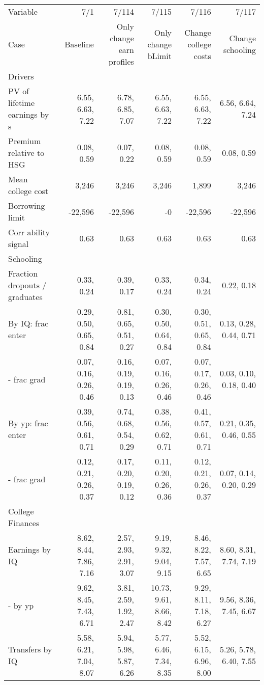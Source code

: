 \begin{tabular}{lrrrrr}
\hline
Variable & 7/1  & 7/114  & 7/115  & 7/116  & 7/117  \\
Case & Baseline  & Only change earn profiles  & Only change bLimit  & Change college costs  & Change schooling  \\
Drivers &   &   &   &   &   \\
PV of lifetime earnings by s & 6.55, 6.63, 7.22  & 6.78, 6.85, 7.07  & 6.55, 6.63, 7.22  & 6.55, 6.63, 7.22  & 6.56, 6.64, 7.24  \\
Premium relative to HSG & 0.08, 0.59  & 0.07, 0.22  & 0.08, 0.59  & 0.08, 0.59  & 0.08, 0.59  \\
Mean college cost & 3,246  & 3,246  & 3,246  & 1,899  & 3,246  \\
Borrowing limit & -22,596  & -22,596  & -0  & -22,596  & -22,596  \\
Corr ability signal & 0.63  & 0.63  & 0.63  & 0.63  & 0.63  \\
\hline
Schooling &   &   &   &   &   \\
Fraction dropouts / graduates & 0.33, 0.24  & 0.39, 0.17  & 0.33, 0.24  & 0.34, 0.24  & 0.22, 0.18  \\
By IQ: frac enter & 0.29, 0.50, 0.65, 0.84  & 0.81, 0.65, 0.51, 0.27  & 0.30, 0.50, 0.64, 0.84  & 0.30, 0.51, 0.65, 0.84  & 0.13, 0.28, 0.44, 0.71  \\
- frac grad & 0.07, 0.16, 0.26, 0.46  & 0.16, 0.19, 0.19, 0.13  & 0.07, 0.16, 0.26, 0.46  & 0.07, 0.17, 0.26, 0.46  & 0.03, 0.10, 0.18, 0.40  \\
By yp: frac enter & 0.39, 0.56, 0.61, 0.71  & 0.74, 0.68, 0.54, 0.29  & 0.38, 0.56, 0.62, 0.71  & 0.41, 0.57, 0.61, 0.71  & 0.21, 0.35, 0.46, 0.55  \\
- frac grad & 0.12, 0.21, 0.26, 0.37  & 0.17, 0.20, 0.19, 0.12  & 0.11, 0.20, 0.26, 0.36  & 0.12, 0.21, 0.26, 0.37  & 0.07, 0.14, 0.20, 0.29  \\
\hline
College Finances &   &   &   &   &   \\
Earnings by IQ & 8.62, 8.44, 7.86, 7.16  & 2.57, 2.93, 2.91, 3.07  & 9.19, 9.32, 9.04, 9.15  & 8.46, 8.22, 7.57, 6.65  & 8.60, 8.31, 7.74, 7.19  \\
- by yp & 9.62, 8.45, 7.43, 6.71  & 3.81, 2.59, 1.92, 2.47  & 10.73, 9.61, 8.66, 8.42  & 9.29, 8.11, 7.18, 6.27  & 9.56, 8.36, 7.45, 6.67  \\
Transfers by IQ & 5.58, 6.21, 7.04, 8.07  & 5.94, 5.98, 5.87, 6.26  & 5.77, 6.46, 7.34, 8.35  & 5.52, 6.15, 6.96, 8.00  & 5.26, 5.78, 6.40, 7.55  \\

\end{tabular}
